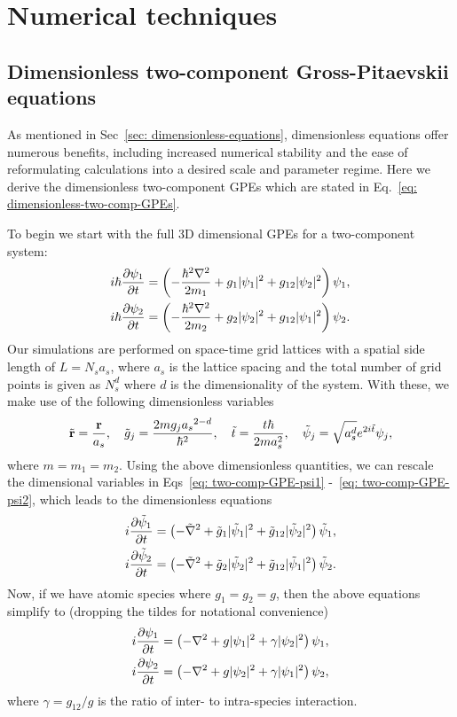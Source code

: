 \chapter{Numerical techniques}\label{appendix: numerical-techniques}

\section{\label{sec: two-comp-dimensionless}Dimensionless two-component
Gross-Pitaevskii equations}

As mentioned in Sec~\ref{sec: dimensionless-equations}, dimensionless equations
offer numerous benefits, including increased numerical stability and the ease
of reformulating calculations into a desired scale and parameter regime.
Here we derive the dimensionless two-component GPEs which are stated in
Eq.~\eqref{eq: dimensionless-two-comp-GPEs}.

To begin we start with the full 3D dimensional GPEs for a two-component system:
\begin{align} \label{eq: two-comp-GPE-psi1}
    i\hbar\pdv{\psi_1}{t} &= \left(-\frac{\hbar^2\nabla^2}{2m_1} + g_1|\psi_1|^2
    +g_{12}|\psi_2|^2\right)\psi_1, \\
    i\hbar\pdv{\psi_2}{t} &= \left(-\frac{\hbar^2\nabla^2}{2m_2} + g_2|\psi_2|^2
    +g_{12}|\psi_1|^2\right)\psi_2. \label{eq: two-comp-GPE-psi2}
\end{align}
Our simulations are performed on space-time grid lattices with a spatial side
length of \(L = N_s a_s\), where \(a_s\) is the lattice spacing and the total
number of grid points is given as \(N_s^d\) where \(d\) is the dimensionality of
the system.
With these, we make use of the following dimensionless variables
\begin{align}
    \tilde{\vb{r}} = \frac{\vb{r}}{a_s}, \quad
    \tilde{g}_j = \frac{2mg_j{a_s}^{2-d}}{\hbar^2}, \quad
    \tilde{t} = \frac{t\hbar}{2ma_s^2}, \quad
    \tilde{\psi}_j = \sqrt{a_s^d}e^{2i\tilde{t}}\psi_j,
\end{align}
where \(m = m_1 = m_2\).
Using the above dimensionless quantities, we can rescale the dimensional
variables in Eqs~\eqref{eq: two-comp-GPE-psi1} -~\eqref{eq: two-comp-GPE-psi2},
which leads to the dimensionless equations
\begin{align}
    i\pdv{\tilde{\psi}_1}{t} &= \left(-\tilde{\nabla}^2
    + \tilde{g}_1|\tilde{\psi}_1|^2 + \tilde{g}_{12}|\tilde{\psi}_2|^2\right)
    \tilde{\psi}_1, \\
    i\pdv{\tilde{\psi}_2}{t} &= \left(-\tilde{\nabla}^2
    + \tilde{g}_2|\tilde{\psi}_2|^2 + \tilde{g}_{12}|\tilde{\psi}_1|^2\right)
    \tilde{\psi}_2.
\end{align}
Now, if we have atomic species where \(g_1=g_2=g\), then the above equations
simplify to (dropping the tildes for notational convenience)
\begin{align}
    i\pdv{{\psi}_1}{t} &= \left(-{\nabla}^2
    + {g}|{\psi}_1|^2 + {\gamma}|{\psi}_2|^2\right)
    {\psi}_1, \\
    i\pdv{{\psi}_2}{t} &= \left(-{\nabla}^2
    + {g}|{\psi}_2|^2 + \gamma|{\psi}_1|^2\right)
    {\psi}_2,
\end{align}
where \(\gamma = g_{12}/g\) is the ratio of inter- to intra-species interaction.